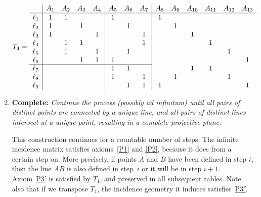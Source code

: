 \begin{xmpl}
\begin{enumerate}[1.]
        \vspace{-2\parskip}
        \small
        \setlength{\arraycolsep}{3pt}
        \begin{align}\label{eq:T4}
            T_4=\begin{array}{l|cccc|ccc|cccccc}
                &A_1 &A_2 &A_3 &A_4 &A_5 &A_6 &A_7
                &A_8 &A_9 &A_{10} &A_{11} &A_{12} &A_{13}\\
                \hline\rule{0pt}{9pt}
                \ell_1 &1&1&&&1&&&1&&&&&\\
                \ell_2 &1 &&1 &&&1&&&1&&&&\\
                \ell_3 &1 &&&1 &&&1&&&1&&&\\
                \ell_4 &&1 &1 &&&&1&&&&1&&\\
                \ell_5 &&1 &&1 &&1&&&&&&1&\\
                \ell_6 &&&1 &1 &1&&&&&&&&1\\
                \cline{1-8}
                \ell_7 &&&&&1 &1&&&&1&1&&\\
                \ell_8 &&&&&1&&1&&1&&&1&\\
                \ell_9 &&&&&&1&1&1&&&&&1
            \end{array}
        \end{align}
        
        \normalsize

        \item \textbf{Complete:} \textit{Continue the process (possibly \textsl{ad infinitum}) until all pairs of distinct points are connected by a unique line, and all pairs of distinct lines intersect at a unique point, resulting in a complete projective plane.}

        This construction continues for a countable number of steps. The infinite incidence matrix satisfies axioms~\ref{P1} and \ref{P2}, because it does from a certain step on. More precisely, if points $A$ and $B$ have been defined in step $i$, then the line $AB$ is also defined in step~$i$ or it will be in step $i+1$. Axiom~\hyperref[lem:alternative-projective-axiom]{P3'} is satisfied by \hyperref[eq:T1]{$T_1$}, and preserved in all subsequent tables. Note also that if we transpose \hyperref[eq:T1]{$T_1$}, the incidence geometry it induces satisfies~\hyperref[lem:alternative-projective-axiom]{P3''}.
    \end{enumerate}
\end{xmpl}


